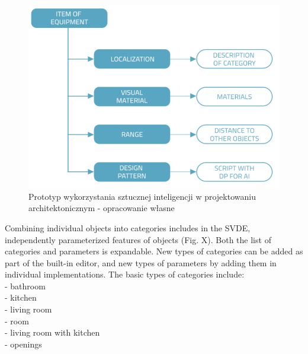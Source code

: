 \documentclass[runningheads]{llncs}
\begin{document}
\begin{figure}[H]
\centering
\includegraphics[width=\textwidth]{graf.png}
\caption{Prototyp wykorzystania sztucznej inteligencji w projektowaniu architektonicznym - 
opracowanie własne} \label{fig1}
\end{figure}

Combining individual objects into categories includes in the SVDE, independently parameterized features of objects (Fig. X). Both the list of categories and parameters is expandable. New types of categories can be added as part of the built-in editor, and new types of parameters by adding them in individual implementations.
The basic types of categories include:\\
- bathroom\\
- kitchen\\
- living room\\
- room\\
- living room with kitchen\\
- openings\\
\end{document}
